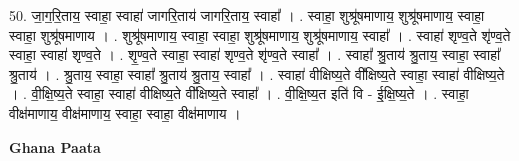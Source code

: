 \documentclass[17pt]{extarticle}
\begin{document}
50. जा॒ग॒रि॒ताय॒ स्वाहा॒ स्वाहा॑ जागरि॒ताय॑ जागरि॒ताय॒ स्वाहा᳚ । . स्वाहा॒ शुश्रू॑षमाणाय॒ शुश्रू॑षमाणाय॒ स्वाहा॒ स्वाहा॒ शुश्रू॑षमाणाय । . शुश्रू॑षमाणाय॒ स्वाहा॒ स्वाहा॒ शुश्रू॑षमाणाय॒ शुश्रू॑षमाणाय॒ स्वाहा᳚ । . स्वाहा॑ शृण्व॒ते शृ॑ण्व॒ते स्वाहा॒ स्वाहा॑ शृण्व॒ते । . शृ॒ण्व॒ते स्वाहा॒ स्वाहा॑ शृण्व॒ते शृ॑ण्व॒ते स्वाहा᳚ । . स्वाहा᳚ श्रु॒ताय॑ श्रु॒ताय॒ स्वाहा॒ स्वाहा᳚ श्रु॒ताय॑ । . श्रु॒ताय॒ स्वाहा॒ स्वाहा᳚ श्रु॒ताय॑ श्रु॒ताय॒ स्वाहा᳚ । . स्वाहा॑ वीक्षिष्य॒ते वी᳚क्षिष्य॒ते स्वाहा॒ स्वाहा॑ वीक्षिष्य॒ते । . वी॒क्षि॒ष्य॒ते स्वाहा॒ स्वाहा॑ वीक्षिष्य॒ते वी᳚क्षिष्य॒ते स्वाहा᳚ । . वी॒क्षि॒ष्य॒त इति॑ वि - ई॒क्षि॒ष्य॒ते । . स्वाहा॒ वीक्ष॑माणाय॒ वीक्ष॑माणाय॒ स्वाहा॒ स्वाहा॒ वीक्ष॑माणाय । \newline

\textbf{Ghana Paata } \newline
\end{document}
